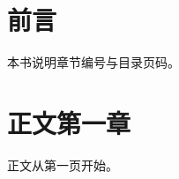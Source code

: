 \documentclass[openany]{ctexbook}
\begin{document}
\frontmatter
\tableofcontents
\chapter{前言}
本书说明章节编号与目录页码。
\mainmatter
\chapter{正文第一章}
正文从第一页开始。
\end{document}
